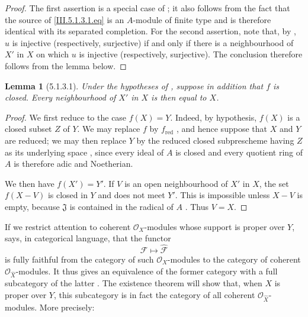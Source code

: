\documentclass[oneside]{amsart}
\theoremstyle{ega-env-style}
\theoremstyle{ega-thm-env-style}
\newtheorem*{lemma}{Lemma}
\theoremstyle{ega-defn-env-style}
\def\mathcal{\mathscr}
\def\sh{\mathcal}                   %
\newcommand{\oldpage}[2][]{{\marginnote{\normalfont{\textbf{#1}~|~#2}}}\ignorespaces}
\let\EGAOriginalLabel\label
\renewcommand{\label}[1]{\phantomsection\EGAOriginalLabel{#1}}
\begin{document}
\begin{proof}
The first assertion is a special case of ; it also
follows from the fact that the source of \eqref{III.5.1.3.1.eq} is
an $A$-module of finite type and is therefore identical with its
separated completion.  For the second assertion, note that, by
, $\widehat{u}$ is injective (respectively,
surjective) if and only if there is a neighbourhood of $X'$ in
$X$ on which $u$ is injective (respectively, surjective).  The
conclusion therefore follows from the lemma below.
\end{proof}

\oldpage[III]{150}

\begin{lemma}[5.1.3.1]
\label{III.5.1.3.1}
Under the hypotheses of , suppose in addition that
$f$ is closed.  Every neighbourhood of $X'$ in $X$ is then equal
to $X$.
\end{lemma}

\begin{proof}
We first reduce to the case $f(X)=Y$.  Indeed, by hypothesis,
$f(X)$ is a closed subset $Z$ of $Y$.  We may replace $f$ by
$f_{\mathrm{red}}$ , and hence suppose that $X$
and $Y$ are reduced; we may then replace $Y$ by the reduced closed
subprescheme having $Z$ as its underlying space
, since every ideal of $A$ is closed and every
quotient ring of $A$ is therefore adic and Noetherian.

We then have $f(X')=Y'$.  If $V$ is an open neighbourhood of $X'$
in $X$, the set $f(X-V)$ is closed in $Y$ and does not meet $Y'$.
This is impossible unless $X-V$ is empty, because $\mathfrak{J}$
is contained in the radical of $A$
 .  Thus $V=X$.
\end{proof}

If we restrict attention to coherent $\sh{O}_X$-modules whose
support is proper over $Y$,  says, in categorical
language, that the functor
\[
  \sh{F}\longmapsto\widehat{\sh{F}}
\]
is fully faithful from the category of such $\sh{O}_X$-modules to
the category of coherent $\sh{O}_{\widehat{X}}$-modules.  It thus
gives an equivalence of the former category with a full
subcategory of the latter .  The existence theorem
will show that, when $X$ is proper over $Y$, this subcategory is in
fact the category of all coherent
$\sh{O}_{\widehat{X}}$-modules.  More precisely:
\end{document}
